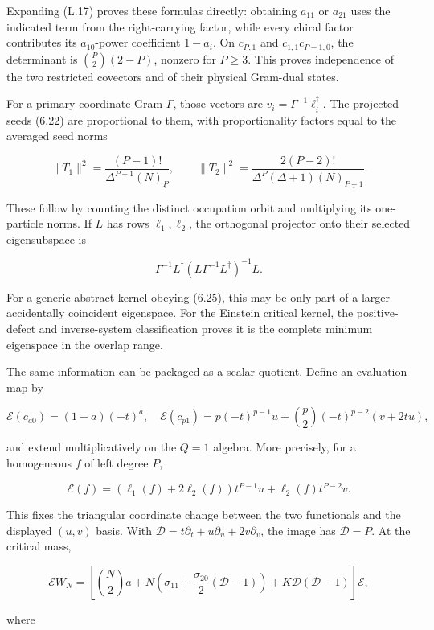 Expanding (L.17) proves these formulas directly: obtaining \(a_{11}\) or \(a_{21}\) uses the indicated term from the right-carrying factor, while every chiral factor contributes its \(a_{10}\)-power coefficient \(1-a_i\). On \(c_{P,1}\) and \(c_{1,1}c_{P-1,0}\), the determinant is \(\binom P2(2-P)\), nonzero for \(P\ge3\). This proves independence of the two restricted covectors and of their physical Gram-dual states.

For a primary coordinate Gram \(\Gamma\), those vectors are \(v_i=\Gamma^{-1}\ell_i^\dagger\). The projected seeds (6.22) are proportional to them, with proportionality factors equal to the averaged seed norms

\[
\|T_1\|^2=\frac{(P-1)!}{\Delta^{P+1}(N)_{\underline P}},\qquad
\|T_2\|^2=\frac{2(P-2)!}{\Delta^P(\Delta+1)(N)_{\underline{P-1}}}.
\tag{L.20}
\]

These follow by counting the distinct occupation orbit and multiplying its one-particle norms. If \(L\) has rows \(\ell_1,\ell_2\), the orthogonal projector onto their selected eigensubspace is

\[
\Gamma^{-1}L^\dagger(L\Gamma^{-1}L^\dagger)^{-1}L.
\tag{L.21}
\]

For a generic abstract kernel obeying (6.25), this may be only part of a larger accidentally coincident eigenspace. For the Einstein critical kernel, the positive-defect and inverse-system classification proves it is the complete minimum eigenspace in the overlap range.

The same information can be packaged as a scalar quotient. Define an evaluation map by

\[
\mathcal E(c_{a0})=(1-a)(-t)^a,
\quad
\mathcal E(c_{p1})=p(-t)^{p-1}u
+\binom p2(-t)^{p-2}(v+2tu),
\tag{L.22}
\]

and extend multiplicatively on the \(Q=1\) algebra. More precisely, for a homogeneous \(f\) of left degree \(P\),

\[
\mathcal E(f)=(\ell_1(f)+2\ell_2(f))t^{P-1}u+\ell_2(f)t^{P-2}v.
\]

This fixes the triangular coordinate change between the two functionals and the displayed \((u,v)\) basis. With \(\mathcal D=t\partial_t+u\partial_u+2v\partial_v\), the image has \(\mathcal D=P\). At the critical mass,

\[
\mathcal E W_N=
\left[\binom N2 a+N\left(\sigma_{11}+\frac{\sigma_{20}}2(\mathcal D-1)\right)
+K\mathcal D(\mathcal D-1)\right]\mathcal E,
\tag{L.23}
\]

where

